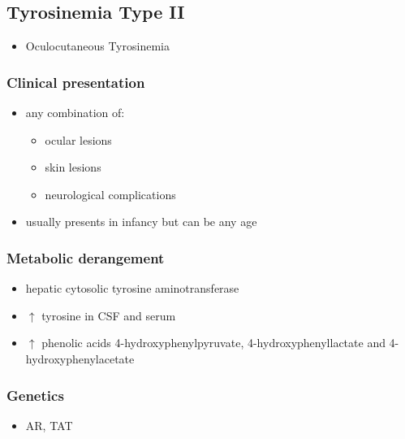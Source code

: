 \documentclass{scrartcl}
\begin{document}
\subsection{Tyrosinemia Type II}
\label{sec:org7753b0a}
\begin{itemize}
\item Oculocutaneous Tyrosinemia
\end{itemize}
\subsubsection{Clinical presentation}
\label{sec:orgd286fd0}
\begin{itemize}
\item any combination of: 
\begin{itemize}
\item ocular lesions
\item skin lesions
\item neurological complications
\end{itemize}
\item usually presents in infancy but can be any age
\end{itemize}

\subsubsection{Metabolic derangement}
\label{sec:org2813a57}
\begin{itemize}
\item hepatic cytosolic tyrosine aminotransferase
\end{itemize}
\begin{itemize}
\item \(\uparrow\) tyrosine in CSF and serum
\end{itemize}
\begin{itemize}
\item \(\uparrow\) phenolic acids 4-hydroxyphenylpyruvate,
4-hydroxyphenyllactate and 4-hydroxyphenylacetate
\end{itemize}

\subsubsection{Genetics}
\label{sec:org20b92b9}
\begin{itemize}
\item AR, TAT
\end{itemize}
\end{document}
